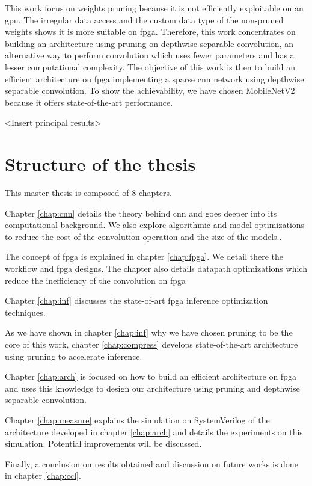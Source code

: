 This work focus on weights pruning because it is not efficiently exploitable on an \acrshort{gpu}. The irregular data access and the custom data type of the non-pruned weights shows it is more suitable on \acrshort{fpga}. Therefore, this work concentrates on building an architecture using pruning on depthwise separable convolution, an alternative way to perform convolution which uses fewer parameters and has a lesser computational complexity. The objective of this work is then to build an efficient architecture on \acrshort{fpga} implementing a sparse \acrshort{cnn} network using depthwise separable convolution. To show the achievability, we have chosen MobileNetV2 because it offers state-of-the-art performance.

<Insert principal results>
%
%
\section*{Structure of the thesis}
%
%
This master thesis is composed of 8 chapters.

Chapter \ref{chap:cnn} details the theory behind \acrshort{cnn} and goes deeper into its computational background. We also explore algorithmic and model optimizations to reduce the cost of the convolution operation and the size of the models..

The concept of \acrshort{fpga} is explained in chapter \ref{chap:fpga}. We detail there the workflow and \acrshort{fpga} designs. The chapter also details datapath optimizations which reduce the inefficiency of the convolution on \acrshort{fpga}

Chapter \ref{chap:inf} discusses the state-of-art \acrshort{fpga} inference optimization techniques.

As we have shown in chapter \ref{chap:inf} why we have chosen pruning to be the core of this work, chapter \ref{chap:compress} develops state-of-the-art architecture using pruning to accelerate inference.

Chapter \ref{chap:arch} is focused on how to build an efficient architecture on \acrshort{fpga} and uses this knowledge to design our architecture using pruning and depthwise separable convolution.

Chapter \ref{chap:measure} explains the simulation on SystemVerilog of the architecture developed in chapter \ref{chap:arch} and details the experiments on this simulation. Potential improvements will be discussed.

Finally, a conclusion on results obtained and discussion on future works is done in chapter \ref{chap:ccl}.

\afterpage{\blankpage}
\cleardoublepage
\newpage
